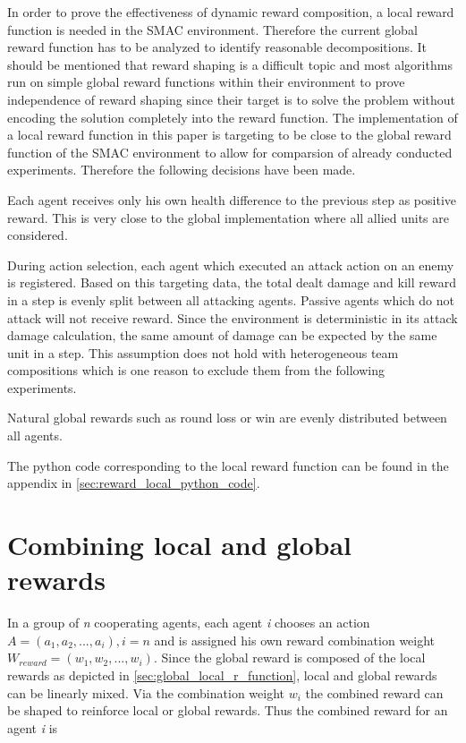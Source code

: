 In order to prove the effectiveness of dynamic reward composition, a local reward function is needed in the SMAC environment. Therefore the current global reward function has to be analyzed to identify reasonable decompositions. It should be mentioned that reward shaping is a difficult topic and most algorithms run on simple global reward functions within their environment to prove independence of reward shaping since their target is to solve the problem without encoding the solution completely into the reward function. The implementation of a local reward function in this paper is targeting to be close to the global reward function of the SMAC environment to allow for comparsion of already conducted experiments. Therefore the following decisions have been made.
 
Each agent receives only his own health difference to the previous step as positive reward. This is very close to the global implementation where all allied units are considered.

During action selection, each agent which executed an attack action on an enemy is registered. Based on this targeting data, the total dealt damage and kill reward in a step is evenly split between all attacking agents. Passive agents which do not attack will not receive reward. Since the environment is deterministic in its attack damage calculation, the same amount of damage can be expected by the same unit in a step. This assumption does not hold with heterogeneous team compositions which is one reason to exclude them from the following experiments.

Natural global rewards such as round loss or win are evenly distributed between all agents.

The python code corresponding to the local reward function  can be found in the appendix in \autoref{sec:reward_local_python_code}.

\section{Combining local and global rewards}

In a group of \textit{n} cooperating agents, each agent \textit{i} chooses an action \newline 
$A = (a_{1},a_{2},...,a_{i}), i = n$ and is assigned his own reward combination weight $W_{reward} = (w_{1},w_{2},...,w_{i})$. Since the global reward is composed of the local rewards as depicted in \autoref{sec:global_local_r_function}, local and global rewards can be linearly mixed. Via the combination weight $w_{i}$ the combined reward can be shaped to reinforce local or global rewards. Thus the combined reward for an agent \textit{i} is

